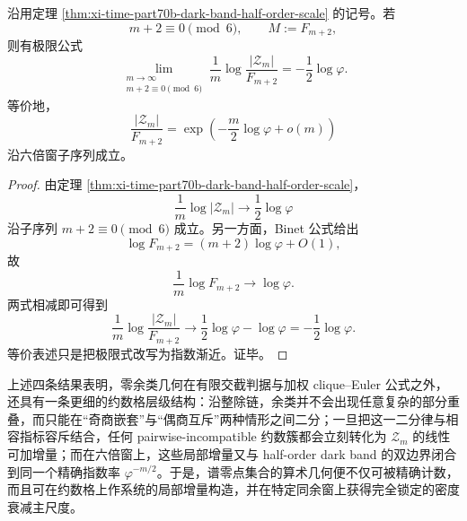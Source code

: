 \begin{theorem}[六倍窗上谱零点相对密度的精确指数率]\label{thm:xi-time-part72-zero-density-exact-exponential-rate}
沿用定理 \ref{thm:xi-time-part70b-dark-band-half-order-scale} 的记号。若
\[
m+2\equiv 0\pmod 6,
\qquad
M:=F_{m+2},
\]
则有极限公式
\[
\lim_{\substack{m\to\infty\\ m+2\equiv 0\!\!\!\pmod 6}}
\frac{1}{m}\log\frac{|\mathcal Z_m|}{F_{m+2}}
=
-\frac12\log\varphi.
\]
等价地，
\[
\frac{|\mathcal Z_m|}{F_{m+2}}
=
\exp\!\left(
-\frac{m}{2}\log\varphi+o(m)
\right)
\]
沿六倍窗子序列成立。
\end{theorem}
\begin{proof}
由定理 \ref{thm:xi-time-part70b-dark-band-half-order-scale}，
\[
\frac{1}{m}\log |\mathcal Z_m|
\longrightarrow
\frac12\log\varphi
\]
沿子序列 \(m+2\equiv 0\pmod 6\) 成立。另一方面，Binet 公式给出
\[
\log F_{m+2}=(m+2)\log\varphi+O(1),
\]
故
\[
\frac{1}{m}\log F_{m+2}\longrightarrow \log\varphi.
\]
两式相减即可得到
\[
\frac{1}{m}\log\frac{|\mathcal Z_m|}{F_{m+2}}
\longrightarrow
\frac12\log\varphi-\log\varphi
=
-\frac12\log\varphi.
\]
等价表述只是把极限式改写为指数渐近。证毕。
\end{proof}

\noindent
上述四条结果表明，零余类几何在有限交截判据与加权 clique--Euler 公式之外，还具有一条更细的约数格层级结构：沿整除链，余类并不会出现任意复杂的部分重叠，而只能在“奇商嵌套”与“偶商互斥”两种情形之间二分；一旦把这一二分律与相容指标容斥结合，任何 pairwise-incompatible 约数簇都会立刻转化为 \(\mathcal Z_m\) 的线性可加增量；而在六倍窗上，这些局部增量又与 half-order dark band 的双边界闭合到同一个精确指数率 \(\varphi^{-m/2}\)。于是，谱零点集合的算术几何便不仅可被精确计数，而且可在约数格上作系统的局部增量构造，并在特定同余窗上获得完全锁定的密度衰减主尺度。





\endinput
